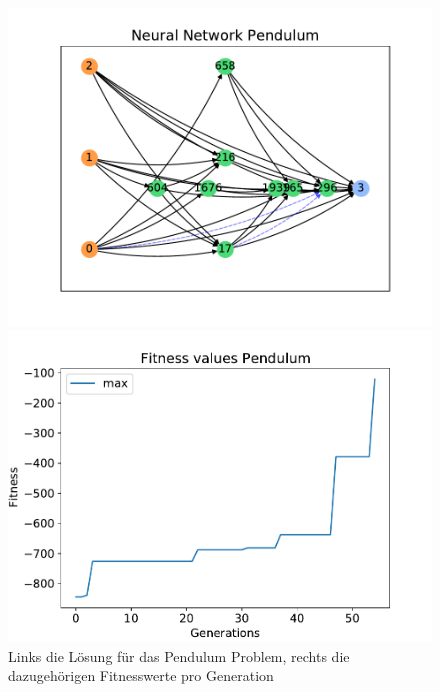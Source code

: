 \begin{figure}[!h]
	\centering
	\begin{minipage}[]{0.49\textwidth}
		\includegraphics[width=1.0\textwidth]{./img/pendulum_single_core/pendulum_1_neural_network.pdf} 
	\end{minipage}
	\hfill
	\begin{minipage}[]{0.49\textwidth}
		\includegraphics[width=1.0\textwidth]{./img/pendulum_single_core/pendulum_1_fitness_values.pdf} 
	\end{minipage}
	\caption{Links die Lösung für das Pendulum Problem, rechts die dazugehörigen Fitnesswerte pro Generation}
	\label{fig:pendulum_car_1core_neural_network_and_fitness}
\end{figure}
